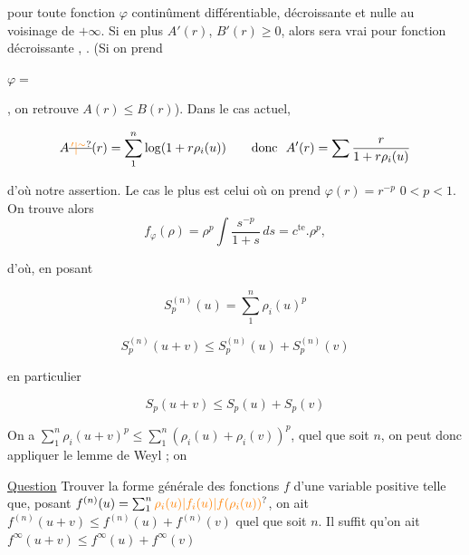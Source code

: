 pour toute fonction $\varphi$ continûment différentiable, décroissante \inserted{sur $[0,+\infty[$} et nulle au voisinage de $+\infty$. Si en plus $A'(r)$, $B'(r)\geq0$, alors  sera vrai pour  fonction décroissante ,   . (Si on prend

$\varphi=$


, on retrouve $A(r)\leq B(r)$). Dans le cas actuel,

\[
A\deleted{\unsure{^{\,\prime}|{}^{\sim}}}(r)=\sum_1^n\log(1+r\rho_i(u))\qquad \text{donc }\ A'(r)=\sum\frac{r}{1+r\rho_i(u)}
\]

d'où notre assertion. Le cas le plus  est celui où on prend $\varphi(r)=r^{-p}$ $0<p<1$. On trouve alors
\[
f_\varphi(\rho)=\rho^p\int\frac{s^{-p}}{1+s}\,ds=c^{\mathrm{te}}.\rho^p,
\]

d'où, en posant  

\[
S_p^{(n)}(u)=\sum_1^n\rho_i(u)^p
\]

\[
S_p^{(n)}(u+v)\leq S_p^{(n)}(u)+S_p^{(n)}(v)
\]

en particulier

\[
S_p(u+v)\leq S_p(u)+S_p(v)
\]

\uline{} On a $\sum_1^n\rho_i(u+v)^p\leq\sum_1^n(\rho_i(u)+\rho_i(v))^p$, quel que soit $n$, on peut donc appliquer le lemme de Weyl ; on 


\uline{Question} Trouver la forme générale des fonctions $f$ d'une variable positive telle que, posant  $f^{(n)}(u)=\sum_1^n\unsure{\rho_i(u)|f_i(u)|f(\rho_i(u))}$, on ait $f^{(n)}(u+v)\leq f^{(n)}(u)+f^{(n)}(v)$ quel que soit $n$. Il suffit qu'on ait $f^{\infty}(u+v)\leq f^{\infty}(u)+f^{\infty}(v)$

